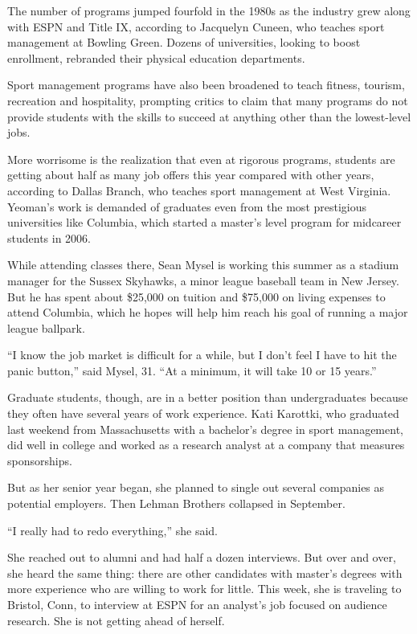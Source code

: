 \documentclass[12pt,a4paper,onecolumn]{article}
\begin{document}
The number of programs jumped fourfold in the 1980s as the industry grew along with ESPN and Title
IX, according to Jacquelyn Cuneen, who teaches sport management at Bowling Green. Dozens of
universities, looking to boost enrollment, rebranded their physical education departments.

Sport management programs have also been broadened to teach fitness, tourism, recreation and
hospitality, prompting critics to claim that many programs do not provide students with the skills
to succeed at anything other than the lowest-level jobs.

More worrisome is the realization that even at rigorous programs, students are getting about half as
many job offers this year compared with other years, according to Dallas Branch, who teaches sport
management at West Virginia. Yeoman's work is demanded of graduates even from the most prestigious
universities like Columbia, which started a master's level program for midcareer students in 2006.

While attending classes there, Sean Mysel is working this summer as a stadium manager for the Sussex
Skyhawks, a minor league baseball team in New Jersey. But he has spent about \$25,000 on tuition and
\$75,000 on living expenses to attend Columbia, which he hopes will help him reach his goal of
running a major league ballpark.

``I know the job market is difficult for a while, but I don't feel I have to hit the panic button,''
said Mysel, 31. ``At a minimum, it will take 10 or 15 years.''

Graduate students, though, are in a better position than undergraduates because they often have
several years of work experience. Kati Karottki, who graduated last weekend from Massachusetts with
a bachelor's degree in sport management, did well in college and worked as a research analyst at a
company that measures sponsorships.

But as her senior year began, she planned to single out several companies as potential employers.
Then Lehman Brothers collapsed in September.

``I really had to redo everything,'' she said.

She reached out to alumni and had half a dozen interviews. But over and over, she heard the same
thing: there are other candidates with master's degrees with more experience who are willing to work
for little. This week, she is traveling to Bristol, Conn, to interview at ESPN for an analyst's job
focused on audience research. She is not getting ahead of herself.
\end{document}
